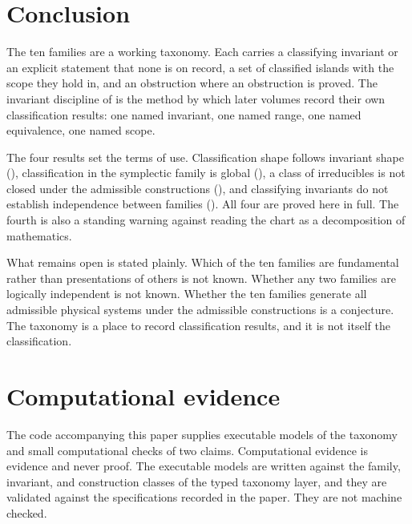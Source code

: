 \documentclass[11pt,letterpaper]{article}
\theoremstyle{definition}
\theoremstyle{remark}
\begin{document}
\section{Conclusion}
\label{sec:conclusion}

The ten families are a working taxonomy. Each carries a classifying invariant or an explicit statement that none is on record, a set of classified islands with the scope they hold in, and an obstruction where an obstruction is proved. The invariant discipline of  is the method by which later volumes record their own classification results: one named invariant, one named range, one named equivalence, one named scope.

The four results set the terms of use. Classification shape follows invariant shape (), classification in the symplectic family is global (), a class of irreducibles is not closed under the admissible constructions (), and classifying invariants do not establish independence between families (). All four are proved here in full. The fourth is also a standing warning against reading the chart as a decomposition of mathematics.

What remains open is stated plainly. Which of the ten families are fundamental rather than presentations of others is not known. Whether any two families are logically independent is not known. Whether the ten families generate all admissible physical systems under the admissible constructions is a conjecture. The taxonomy is a place to record classification results, and it is not itself the classification.

\appendix
\section{Computational evidence}
\label{app:code}

The code accompanying this paper supplies executable models of the taxonomy and small computational checks of two claims. Computational evidence is evidence and never proof. The executable models are written against the family, invariant, and construction classes of the typed taxonomy layer, and they are validated against the specifications recorded in the paper. They are not machine checked.
\end{document}
